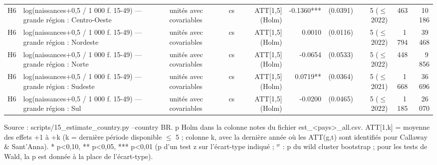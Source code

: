\begin{table}
\begin{threeparttable}
\begin{tabular}{lp{7.5cm}llrrrrrr}
H6 & log(naissances+0,5 / 1 000 f. 15-49) — grande région : Centro-Oeste & unités avec covariables & cs & ATT[1,5] (Holm) & -0.1360*** & (0.0391) & 5 ($\leq$ 2022) & 463 & 10\,186 \\
H6 & log(naissances+0,5 / 1 000 f. 15-49) — grande région : Nordeste & unités avec covariables & cs & ATT[1,5] (Holm) & 0.0010 & (0.0116) & 5 ($\leq$ 2022) & 1\,794 & 39\,468 \\
H6 & log(naissances+0,5 / 1 000 f. 15-49) — grande région : Norte & unités avec covariables & cs & ATT[1,5] (Holm) & -0.0654 & (0.0533) & 5 ($\leq$ 2022) & 448 & 9\,856 \\
H6 & log(naissances+0,5 / 1 000 f. 15-49) — grande région : Sudeste & unités avec covariables & cs & ATT[1,5] (Holm) & 0.0719** & (0.0364) & 5 ($\leq$ 2021) & 1\,668 & 36\,696 \\
H6 & log(naissances+0,5 / 1 000 f. 15-49) — grande région : Sul & unités avec covariables & cs & ATT[1,5] (Holm) & -0.0200 & (0.0465) & 5 ($\leq$ 2022) & 1\,185 & 26\,070 \\
\bottomrule
\end{tabular}
\begin{tablenotes}\footnotesize
\item Source : scripts/15\_estimate\_country.py --country BR. p Holm dans la colonne notes du fichier est\_<pays>\_all.csv. ATT[1,k] = moyenne des effets +1 à +k (k = dernière période disponible $\leq$ 5 ; colonne k, avec la dernière année où les ATT(g,t) sont identifiés pour Callaway \& Sant'Anna). * p<0,10, ** p<0,05, *** p<0,01 (p d'un test z sur l'écart-type indiqué ; $^{w}$ : p du wild cluster bootstrap ; pour les tests de Wald, la p est donnée à la place de l'écart-type).
\end{tablenotes}
\end{threeparttable}
\end{table}
